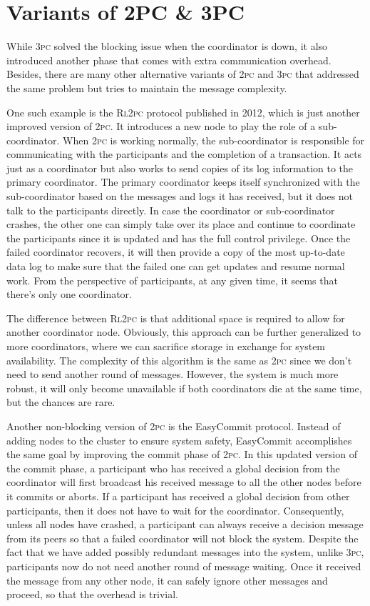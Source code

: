\documentclass[11pt]{article}
\begin{document}
  \section{Variants of 2PC \& 3PC}
    While \textsc{3pc} solved the blocking issue when the coordinator is down, it also introduced another phase that comes with extra communication overhead. Besides, there are many other alternative variants of \textsc{2pc} and \textsc{3pc} that addressed the same problem but tries to maintain the message complexity.

    One such example is the \textsc{Rl2pc} protocol published in 2012\autocite{i2pc}, which is just another improved version of \textsc{2pc}. It introduces a new node to play the role of a sub-coordinator. When \textsc{2pc} is working normally, the sub-coordinator is responsible for communicating with the participants and the completion of a transaction. It acts just as a coordinator but also works to send copies of its log information to the primary coordinator. The primary coordinator keeps itself synchronized with the sub-coordinator based on the messages and logs it has received, but it does not talk to the participants directly. In case the coordinator or sub-coordinator crashes, the other one can simply take over its place and continue to coordinate the participants since it is updated and has the full control privilege. Once the failed coordinator recovers, it will then provide a copy of the most up-to-date data log to make sure that the failed one can get updates and resume normal work. From the perspective of participants, at any given time, it seems that there's only one coordinator.

    The difference between \textsc{Rl2pc} is that additional space is required to allow for another coordinator node. Obviously, this approach can be further generalized to more coordinators, where we can sacrifice storage in exchange for system availability. The complexity of this algorithm is the same as \textsc{2pc} since we don't need to send another round of messages. However, the system is much more robust, it will only become unavailable if both coordinators die at the same time, but the chances are rare.

    Another non-blocking version of \textsc{2pc} is the EasyCommit protocol\autocite{i2pc2}. Instead of adding nodes to the cluster to ensure system safety, EasyCommit accomplishes the same goal by improving the commit phase of \textsc{2pc}. In this updated version of the commit phase, a participant who has received a global decision from the coordinator will first broadcast his received message to all the other nodes before it commits or aborts. If a participant has received a global decision from other participants, then it does not have to wait for the coordinator. Consequently, unless all nodes have crashed, a participant can always receive a decision message from its peers so that a failed coordinator will not block the system. Despite the fact that we have added possibly redundant messages into the system, unlike \textsc{3pc}, participants now do not need another round of message waiting. Once it received the message from any other node, it can safely ignore other messages and proceed, so that the overhead is trivial.
\end{document}
